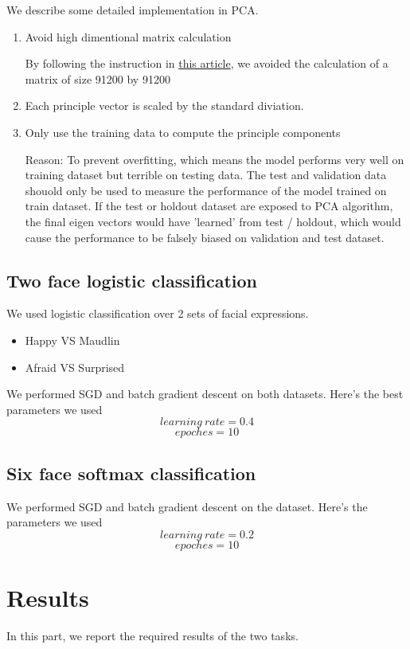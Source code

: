 \documentclass{article} %
\begin{document}
We describe some detailed implementation in PCA.

\begin{enumerate}[1]
    \item Avoid high dimentional matrix calculation
    
    By following the instruction in \href{https://stackoverflow.com/questions/13224362/principal-component-analysis-pca-in-python}{this article}, we avoided the calculation of a matrix of size 91200 by 91200 
    
    \item Each principle vector is scaled by the standard diviation.
    \item Only use the training data to compute the principle components
    
    Reason: To prevent overfitting, which means the model performs very well on training dataset but terrible on testing data. The test and validation data shouold only be used to measure the performance of the model trained on train dataset. 
    If the test or holdout dataset are exposed to PCA algorithm, the final eigen vectors would have 'learned' from test / holdout, which would cause the performance 
    to be falsely biased on validation and test dataset.
\end{enumerate}

\subsection{Two face logistic classification}
We used logistic classification over 2 sets of facial expressions.

\begin{itemize}
    \item Happy VS Maudlin
    \item Afraid VS Surprised
\end{itemize}

We performed SGD and batch gradient descent on both datasets. Here's the best parameters we used
$$learning\ rate = 0.4$$
$$epoches = 10$$

\subsection{Six face softmax classification}

We performed SGD and batch gradient descent on the dataset. Here's the parameters we used
$$learning\ rate = 0.2$$
$$epoches = 10$$

\section{Results}
In this part, we report the required results of the two tasks.
\end{document}
